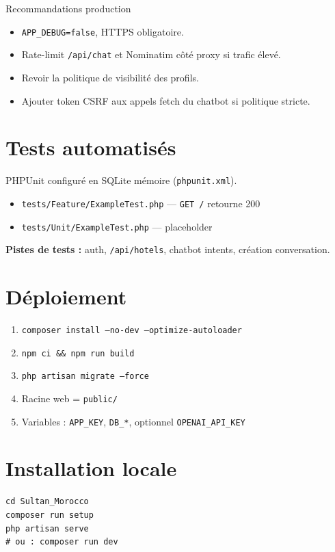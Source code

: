 \begin{warnbox}{Recommandations production}
\begin{itemize}
  \item \texttt{APP\_DEBUG=false}, HTTPS obligatoire.
  \item Rate-limit \texttt{/api/chat} et Nominatim côté proxy si trafic élevé.
  \item Revoir la politique de visibilité des profils.
  \item Ajouter token CSRF aux appels fetch du chatbot si politique stricte.
\end{itemize}
\end{warnbox}

\section{Tests automatisés}

PHPUnit configuré en SQLite mémoire (\texttt{phpunit.xml}).

\begin{itemize}
  \item \texttt{tests/Feature/ExampleTest.php} — \texttt{GET /} retourne 200
  \item \texttt{tests/Unit/ExampleTest.php} — placeholder
\end{itemize}

\textbf{Pistes de tests :} auth, \texttt{/api/hotels}, chatbot intents, création conversation.

\section{Déploiement}

\begin{enumerate}
  \item \texttt{composer install --no-dev --optimize-autoloader}
  \item \texttt{npm ci \&\& npm run build}
  \item \texttt{php artisan migrate --force}
  \item Racine web = \texttt{public/}
  \item Variables : \texttt{APP\_KEY}, \texttt{DB\_*}, optionnel \texttt{OPENAI\_API\_KEY}
\end{enumerate}

\section{Installation locale}

\begin{lstlisting}[language={},caption={Commandes essentielles}]
cd Sultan_Morocco
composer run setup
php artisan serve
# ou : composer run dev
\end{lstlisting}
